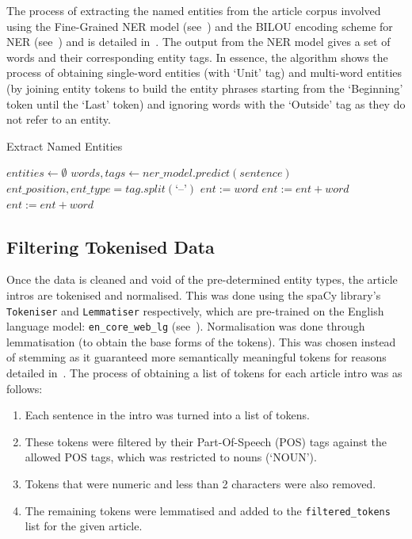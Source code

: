 The process of extracting the named entities from the article corpus involved using the Fine-Grained NER model (see~) and the BILOU encoding scheme for NER (see~) and is detailed in~. The output from the NER model gives a set of words and their corresponding entity tags. In essence, the algorithm shows the process of obtaining single-word entities (with `Unit' tag) and multi-word entities (by joining entity tokens to build the entity phrases starting from the `Beginning' token until the `Last' token) and ignoring words with the `Outside' tag as they do not refer to an entity.

\begin{algorithm}[H]
  \caption{Extract Named Entities}
  \label{alg:named_ents}
  \begin{algorithmic}   
  \State $\mathit{entities} \leftarrow \emptyset$
  \State $\mathit{words, tags} \leftarrow \mathit{ner\_model.predict}(sentence)$
        \EndIf
    \State $ \mathit{ent\_position, ent\_type} = \mathit{tag.split}(\text{`--'})$
    \Else
      \State $ent := word$
      \State  $\mathit{ent:= ent + word}$
      \State  $\mathit{ent := ent + word} $
      \EndIf
    \EndIf
  \EndFor
\end{algorithmic}
\end{algorithm}

\subsection{Filtering Tokenised Data} \label{filtered_tokens}
Once the data is cleaned and void of the pre-determined entity types, the article intros are tokenised and normalised. This was done using the spaCy library's \texttt{Tokeniser} and \texttt{Lemmatiser} respectively, which are pre-trained on the English language model: \texttt{en\_core\_web\_lg} (see~). Normalisation was done through lemmatisation (to obtain the base forms of the tokens). This was chosen instead of stemming as it guaranteed more semantically meaningful tokens for reasons detailed in~. The process of obtaining a list of tokens for each article intro was as follows:
\begin{enumerate}
    \item Each sentence in the intro was turned into a list of tokens.
    \item These tokens were filtered by their Part-Of-Speech (POS) tags against the allowed POS tags, which was restricted to nouns (`NOUN').
    \item Tokens that were numeric and less than 2 characters were also removed. 
    \item The remaining tokens were lemmatised and added to the \texttt{filtered\_tokens} list for the given article.
\end{enumerate}

